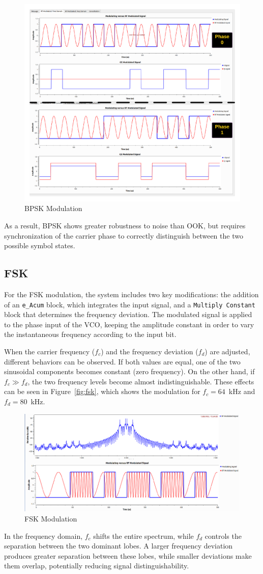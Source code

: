 \documentclass{journal}[IEEEtran, twocolumn]             %
\begin{document}
\begin{multicols}{2}
\begin{figure}[H]
    \centering
        \centering
        \includegraphics[width=0.6\columnwidth]{figs/BPSK.png}
    \caption{BPSK Modulation}
    \label{fig:figBPSK}
\end{figure}
As a result, BPSK shows greater robustness to noise than OOK, but requires 
synchronization of the carrier phase to correctly distinguish between the two 
possible symbol states.


\subsection{FSK}
For the FSK modulation, the system includes two key modifications: the addition 
of an \texttt{e\_Acum} block, which integrates the input signal, and a 
\texttt{Multiply Constant} block that determines the frequency deviation. 
The modulated signal is applied to the phase input of the VCO, keeping the 
amplitude constant in order to vary the instantaneous frequency according 
to the input bit.

When the carrier frequency ($f_c$) and the frequency deviation ($f_d$) are adjusted, 
different behaviors can be observed. If both values are equal, one of the two 
sinusoidal components becomes constant (zero frequency). On the other hand, 
if $f_c \gg f_d$, the two frequency levels become almost indistinguishable. 
These effects can be seen in Figure~\ref{fig:fsk}, which shows the modulation 
for $f_c = 64$~kHz and $f_d = 80$~kHz.

\begin{figure}[H]
    \centering
        \centering
        \includegraphics[width=0.6\columnwidth]{figs/FSK.png}
    \caption{FSK Modulation}
    \label{fig:figFSK}
\end{figure}
In the frequency domain, $f_c$ shifts the entire spectrum, while $f_d$ controls 
the separation between the two dominant lobes. A larger frequency deviation 
produces greater separation between these lobes, while smaller deviations 
make them overlap, potentially reducing signal distinguishability.



\end{multicols}
\end{document}
